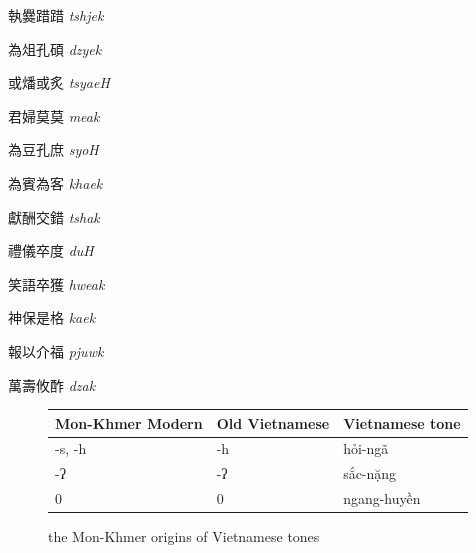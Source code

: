\begin{description} \item
執爨踖踖 \emph{tshjek}
\end{description}

\begin{description} \item
為俎孔碩 \emph{dzyek}
\end{description}

\begin{description} \item
或燔或炙 \emph{tsyaeH}
\end{description}

\begin{description} \item
君婦莫莫 \emph{meak}
\end{description}

\begin{description} \item
為豆孔庶 \emph{syoH}
\end{description}

\begin{description} \item
為賓為客 \emph{khaek}
\end{description}

\begin{description} \item
獻酬交錯 \emph{tshak}
\end{description}

\begin{description} \item
禮儀卒度 \emph{duH}
\end{description}

\begin{description} \item
笑語卒獲 \emph{hweak}
\end{description}

\begin{description} \item
神保是格 \emph{kaek}
\end{description}

\begin{description} \item
報以介福 \emph{pjuwk}
\end{description}

萬壽攸酢 \emph{dzak}

\begin{figure}
    \centering
\begin{tabular}{|l|l|l|}
\hline
Mon-Khmer Modern & 
Old Vietnamese &
Vietnamese tone \\ \hline
-s, -h &
-h &
hỏi-ngã \\ \hline
-ʔ &
-ʔ &
sắc-nặng \\ \hline
0 &
0 &
ngang-huyền \\ \hline
\end{tabular}
    \caption{the Mon-Khmer origins of Vietnamese tones}
    \label{fig:MK-origins-Viet-tones}
\end{figure}

